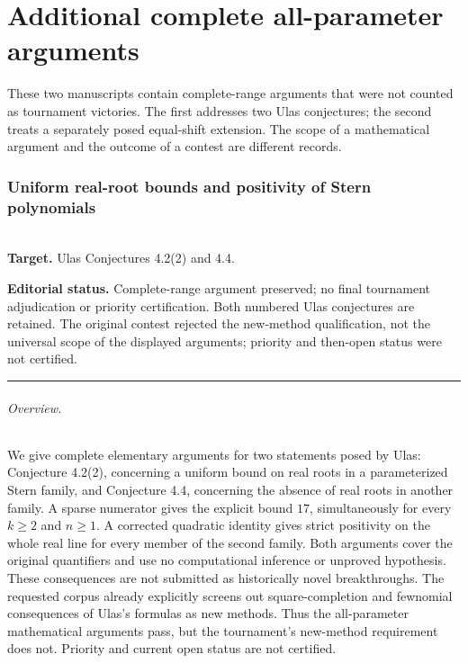 \documentclass[11pt,a4paper]{article}
\begin{document}
\clearpage

\part{Additional complete all-parameter arguments}

\noindent These two manuscripts contain complete-range arguments that were not counted as tournament victories. The first addresses two Ulas conjectures; the second treats a separately posed equal-shift extension. The scope of a mathematical argument and the outcome of a contest are different records.


\section{Uniform real-root bounds and positivity of Stern polynomials}
\label{section:R02K}
\\[3pt]
\noindent\textbf{Target.} Ulas Conjectures 4.2(2) and 4.4.

\noindent\textbf{Editorial status.} Complete-range argument preserved; no final tournament adjudication or priority certification. Both numbered Ulas conjectures are retained. The original contest rejected the new-method qualification, not the universal scope of the displayed arguments; priority and then-open status were not certified.

\smallskip\hrule\medskip



\begingroup
\newcommand{\R}{\mathbb R}
\newcommand{\N}{\mathbb N}
\setcounter{equation}{0}
\renewcommand{\theequation}{\thesection.\arabic{equation}}
\renewcommand{\theHequation}{R02K.\arabic{equation}}
\paragraph{Overview.}
We give complete elementary arguments for two statements posed by Ulas:
Conjecture 4.2(2), concerning a uniform bound on real roots in a
parameterized Stern family, and Conjecture 4.4, concerning the absence of
real roots in another family. A sparse numerator gives the explicit bound
$17$, simultaneously for every $k\ge2$ and $n\ge1$. A corrected quadratic
identity gives strict positivity on the whole real line for every member
of the second family. Both arguments cover the original quantifiers and
use no computational inference or unproved hypothesis. These consequences are not submitted as historically novel breakthroughs.
The requested corpus already explicitly screens out square-completion and
fewnomial consequences of Ulas's formulas as new methods. Thus the
all-parameter mathematical arguments pass, but the tournament's new-method
requirement does not. Priority and current open status are not certified.
\end{document}
